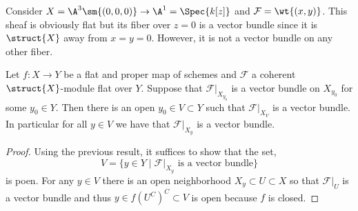 \documentclass[12pt]{article}
\renewcommand{\F}{\mathcal{F}}
\begin{document}
\begin{example}
Consider $X = \A^3 \sm \{(0,0,0)\} \to \A^1 = \Spec{k[z]}$ and $\F = \wt{(x,y)}$. This sheaf is obviously flat but its fiber over $z = 0$ is a vector bundle since it is $\struct{X}$ away from $x = y = 0$. However, it is not a vector bundle on any other fiber. 
\end{example}


\begin{cor}
Let $f : X \to Y$ be a flat and proper map of schemes and $\F$ a coherent $\struct{X}$-module flat over $Y$. Suppose that $\F|_{X_{y_0}}$ is a vector bundle on $X_{y_0}$ for some $y_0 \in Y$. Then there is an open $y_0 \in V \subset Y$ such that $\F|_{X_V}$ is a vector bundle. In particular for all $y \in V$ we have that $\F|_{X_{y}}$ is a vector bundle.
\end{cor}

\begin{proof}
Using the previous result, it suffices to show that the set,
\[ V = \{ y \in Y \mid \F|_{X_y} \text{ is a vector bundle} \} \]
is poen. For any $y \in V$ there is an open neighborhood $X_y \subset U \subset X$ so that $\F|_U$ is a vector bundle and thus $y \in f(U^C)^C \subset V$ is open because $f$ is closed.
\end{proof}
\end{document}
